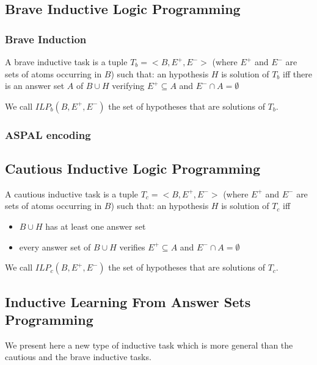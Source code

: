 
\subsection{Brave Inductive Logic Programming}

\subsubsection{Brave Induction}

A brave inductive task is a tuple $T_b=<B, E^+, E^->$ (where $E^+$ and $E^-$ are sets of atoms occurring in $B$) such that: an hypothesis $H$ is solution of $T_b$ iff there is an answer set $A$ of $B\cup H$ verifying $E^+\subseteq A$ and $E^-\cap A = \emptyset$

\smallskip

We call $ILP_b(B,E^+,E^-)$ the set of hypotheses that are solutions of $T_b$. 

\subsubsection{ASPAL encoding}


\subsection{Cautious Inductive Logic Programming}

A cautious inductive task is a tuple $T_c=<B, E^+, E^->$ (where $E^+$ and $E^-$ are sets of atoms occurring in $B$) such that: an hypothesis $H$ is solution of $T_c$ iff 
\begin{itemize}
\item $B\cup H$ has at least one answer set
\item every answer set of $B\cup H$ verifies $E^+\subseteq A$ and $E^-\cap A = \emptyset$
\end{itemize}

We call $ILP_c(B,E^+,E^-)$ the set of hypotheses that are solutions of $T_c$. 


\subsection{Inductive Learning From Answer Sets Programming}

We present here a new type of inductive task which is more general than the cautious and the brave inductive tasks.

